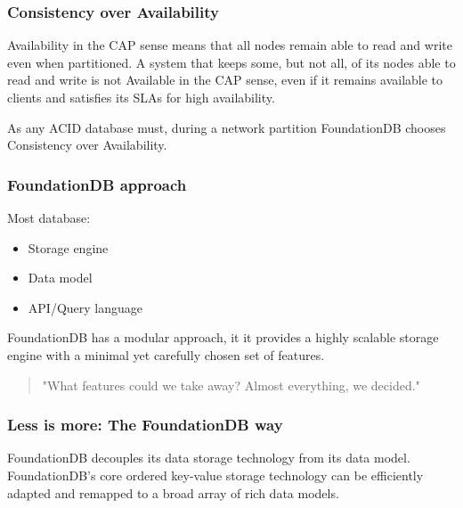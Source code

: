 
\begin{frame}
	\frametitle{Consistency over Availability}

 Availability in the CAP sense means that all nodes remain able to read and write even when partitioned. A system that keeps some, but not all, of its nodes able to read and write is not Available in the CAP sense, even if it remains available to clients and satisfies its SLAs for high availability.
\vspace{0.5cm}

As any ACID database must, during a network partition FoundationDB chooses Consistency over Availability. 

\end{frame}


\begin{frame}
	\frametitle{FoundationDB approach}
Most database: 
    \begin{itemize}
        \item Storage engine
        \item Data model
        \item API/Query language
    \end{itemize}

FoundationDB has a modular approach, it it provides a highly scalable storage engine with a minimal yet carefully chosen set of features.

\vspace{0.5cm}
\begin{quote}
    "What features could we take away? Almost everything, we decided."
\end{quote}
        
\end{frame}



\begin{frame}
	\frametitle{Less is more: The FoundationDB way}
FoundationDB decouples its data storage technology from its data model. FoundationDB’s core ordered key-value storage technology can be efficiently adapted and remapped to a broad array of rich data models.
\end{frame}


